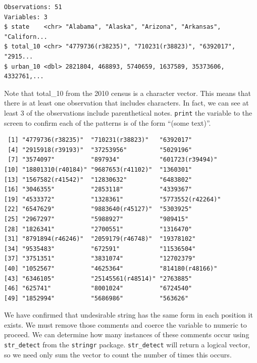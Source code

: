 \documentclass[]{book}
\newenvironment{Shaded}{\begin{snugshade}}{\end{snugshade}}
\newcommand{\DecValTok}[1]{\textcolor[rgb]{0.00,0.00,0.81}{#1}}
\newcommand{\NormalTok}[1]{#1}
\newcommand{\OperatorTok}[1]{\textcolor[rgb]{0.81,0.36,0.00}{\textbf{#1}}}
\begin{document}
\begin{verbatim}
Observations: 51
Variables: 3
$ state    <chr> "Alabama", "Alaska", "Arizona", "Arkansas", "Californ...
$ total_10 <chr> "4779736(r38235)", "710231(r38823)", "6392017", "2915...
$ urban_10 <dbl> 2821804, 468893, 5740659, 1637589, 35373606, 4332761,...
\end{verbatim}

Note that total\_10 from the 2010 census is a character vector. This means that there is at least one observation that includes characters. In fact, we can see at least 3 of the observations include parenthetical notes. \texttt{print} the variable to the screen to confirm each of the patterns is of the form ``(some text)''.

\begin{Shaded}
\end{Shaded}

\begin{verbatim}
 [1] "4779736(r38235)"  "710231(r38823)"   "6392017"         
 [4] "2915918(r39193)"  "37253956"         "5029196"         
 [7] "3574097"          "897934"           "601723(r39494)"  
[10] "18801310(r40184)" "9687653(r41102)"  "1360301"         
[13] "1567582(r41542)"  "12830632"         "6483802"         
[16] "3046355"          "2853118"          "4339367"         
[19] "4533372"          "1328361"          "5773552(r42264)" 
[22] "6547629"          "9883640(r45127)"  "5303925"         
[25] "2967297"          "5988927"          "989415"          
[28] "1826341"          "2700551"          "1316470"         
[31] "8791894(r46246)"  "2059179(r46748)"  "19378102"        
[34] "9535483"          "672591"           "11536504"        
[37] "3751351"          "3831074"          "12702379"        
[40] "1052567"          "4625364"          "814180(r48166)"  
[43] "6346105"          "25145561(r48514)" "2763885"         
[46] "625741"           "8001024"          "6724540"         
[49] "1852994"          "5686986"          "563626"          
\end{verbatim}

We have confirmed that undesirable string has the same form in each position it exists. We must remove those comments and coerce the variable to numeric to proceed. We can determine how many instances of these comments occur using \texttt{str\_detect} from the \texttt{stringr} package. \texttt{str\_detect} will return a logical vector, so we need only sum the vector to count the number of times this occurs.
\end{document}
